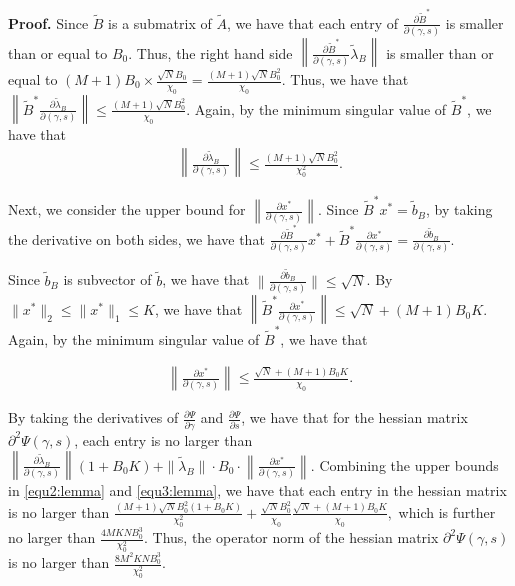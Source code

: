 \documentclass[10pt,a4paper]{amsart}
\renewenvironment{proof}[1]{\par\medskip\noindent\textbf{#1}\enspace\ignorespaces}{\par\medskip}
\newcommand{\tB}{\tilde{B}}
\newcommand{\tilb}{\tilde{b}}
\newcommand{\tlam}{\tilde{\lambda}}
\renewcommand{\tilde}{\widetilde}
\begin{document}
\begin{proof}{Proof.}
	Since  $\tB$ is a submatrix of $\tilde{A}$, we have that each entry of $ \frac{\partial \tB^*}{ \partial (\gamma, s) }$ is smaller than or equal to $B_0$. Thus, the right hand side $\left\| \frac{\partial \tB^*}{ \partial (\gamma, s) } \tlam_B \right\| $ is smaller than or equal to $ (M+1 ) B_0 \times   \frac{ \sqrt{N}B_0}{\chi_0} =  \frac{ (M+1)\sqrt{N}B_0^2}{\chi_0}$. Thus, we have that $\left\| \tB^*  \frac{\partial \tlam_B}{ \partial (\gamma, s) } \right\| \le \frac{ (M+1)\sqrt{N}B_0^2}{\chi_0}$. 
	Again, by the minimum singular value of $\tB^*$, we have that 
	\begin{align}\label{equ2:lemma}
		\left \|   \frac{\partial \tlam_B}{ \partial (\gamma, s) } \right\| \le \frac{ (M+1)\sqrt{N}B_0^2}{\chi_0^2}.
	\end{align}
	
	Next, we consider the upper bound for $\left \|   \frac{\partial  x^*}{ \partial (\gamma, s) } \right\|$. Since $\tB^* x^* = \tilb_B$, by taking the derivative on both sides, we have that  $\frac{\partial \tB^*}{ \partial (\gamma, s) } x^* +  \tB^*  \frac{\partial x^*}{ \partial (\gamma, s) } = \frac{\partial \tilb_B}{ \partial (\gamma, s) }. $
	
	
	Since $\tilb_B$ is subvector of $\tilb$, we have that $\| \frac{\partial \tilb_B}{ \partial (\gamma, s) }\| \le \sqrt{N}$.
	By $\|x^*\|_2 \le \|x^*\|_1 \le K$, we have that  $\left\| \tB^*  \frac{\partial x^*}{ \partial (\gamma, s) } \right\| \le \sqrt{N} + (M+1)B_0 K$. Again, by the minimum singular value of $\tB^*$, we have that
	
	\begin{align}\label{equ3:lemma}
		\left \|   \frac{\partial x^*}{ \partial (\gamma, s) } \right\| \le \frac{\sqrt{N} + (M+1)B_0 K}{\chi_0}.
	\end{align}
	
	By taking the derivatives of $\frac{\partial \Psi}{\partial \gamma}$ and $\frac{\partial \Psi}{\partial s}$, we have that for the hessian matrix $\partial^2 \Psi(\gamma,s)$, each entry is no larger than $ \left \|   \frac{\partial \tlam_B}{ \partial (\gamma, s) } \right\|  (1 + B_0 K) + \|\tlam_B\| \cdot B_0 \cdot \left \|   \frac{\partial x^*}{ \partial (\gamma, s) } \right\|. $
	Combining the upper bounds in \eqref{equ2:lemma} and \eqref{equ3:lemma}, we have that each entry in the hessian matrix is no larger than $ \frac{ (M+1)\sqrt{N}B_0^2 (1 + B_0 K)}{\chi_0^2} +  \frac{ \sqrt{N}B_0^2}{\chi_0}   \frac{\sqrt{N} + (M+1)B_0 K}{\chi_0},$
	which is further no larger than $\frac{4 MKN B_0^3}{\chi_0^2}$. Thus, the operator norm of the hessian matrix $\partial^2 \Psi(\gamma,s)$ is no larger than $\frac{8 M^2 KN B_0^3}{\chi_0^2}$.
\end{proof}
\end{document}
